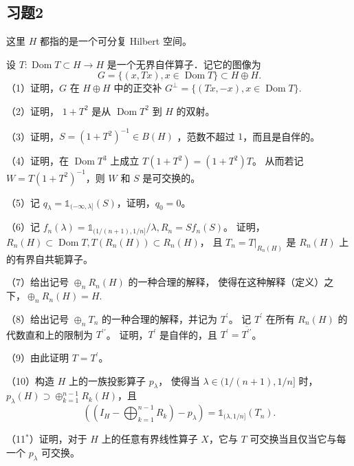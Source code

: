 \subsection*{习题2}
这里 $H$ 都指的是一个可分复 Hilbert 空间。
\begin{1}
设 $T: \operatorname{Dom} T \subset H \rightarrow H$ 是一个无界自伴算子．记它的图像为
$$
G=\{(x, T x), x \in \operatorname{Dom} T\} \subset H \oplus H .
$$
（1）证明，$G$ 在 $H \oplus H$ 中的正交补 $G^{\perp}=\{(T x,-x), x \in \operatorname{Dom} T\}.$ 

（2）证明， $1+T^{2}$ 是从 $\operatorname{Dom} T^{2}$ 到 $H$ 的双射。

（3）证明，$S=(1+T^{2})^{-1} \in B(H)$ ，范数不超过 $1$，而且是自伴的。

（4）证明，在 $\operatorname{Dom} T^{3}$ 上成立 $T(1+T^{2})=(1+T^{2})T$。
从而若记 $W=T(1+T^{2})^{-1}$，则 $W$ 和 $S$ 是可交换的。

（5）记 $q_{\lambda}=\mathbb{1}_{(-\infty, \lambda]}(S)$，证明，$q_{0}=0$。

（6）记 $f_{n}(\lambda)=\mathbb{1}_{(1/(n+1), 1/n]} / \lambda, R_{n}=S f_{n}(S)$。
证明，$R_{n}(H) \subset \operatorname{Dom} T, T(R_{n}(H)) \subset R_{n}(H)$，
且 $T_{n}=T|_{R_{n}(H)}$ 是 $R_{n}(H)$ 上的有界自共轭算子。

（7）给出记号 $\oplus_{n} R_{n}(H)$ 的一种合理的解释，
使得在这种解释（定义）之下，$\oplus_{n} R_{n}(H)=H$.

（8）给出记号 $\oplus_{n} T_{n}$ 的一种合理的解释，并记为 $T^{\prime}$。
记 $T^{\prime}$ 在所有 $R_{n}(H)$ 的代数直和上的限制为 $T^{\prime \prime}$。
证明，$T^{\prime}$ 是自伴的，且 $T^{\prime}=\overline{T^{\prime \prime}}$。

（9）由此证明 $T=T^{\prime}$。

（10）构造 $H$ 上的一族投影算子 $p_{\lambda}$，
使得当 $\lambda \in(1/(n+1), 1/n]$ 时，
$p_{\lambda}(H) \supset \oplus_{k=1}^{n-1} R_{k}(H)$，且
$$\left(\left(I_{H}-\bigoplus_{k=1}^{n-1} R_{k}\right)-p_{\lambda}\right)
=\mathbb{1}_{(\lambda, 1/n]}(T_{n}).$$

（11${ }^*$）证明，对于 $H$ 上的任意有界线性算子 $X$，它与 $T$ 可交换当且仅当它与每一个 $p_{\lambda}$ 可交换。
\end{1}
